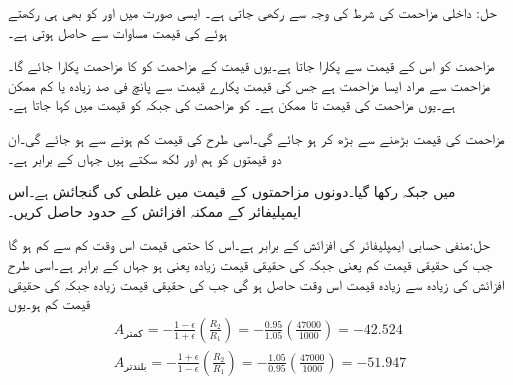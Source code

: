 حل:
داخلی مزاحمت  کی شرط کی وجہ سے  رکھی جاتی ہے۔ ایسی صورت میں  اور  کو بھی  ہی رکھتے ہوئے  کی قیمت مساوات   سے حاصل ہوتی ہے۔  

مزاحمت کو اس کے قیمت سے پکارا جاتا ہے۔یوں  قیمت کے مزاحمت کو  کا مزاحمت پکارا جائے گا۔ مزاحمت سے مراد ایسا مزاحمت ہے جس کی قیمت پکارے قیمت سے  پانچ فی صد زیادہ یا کم ممکن ہے۔یوں 
 مزاحمت کی قیمت  تا  ممکن ہے۔ کو مزاحمت کی  جبکہ   کو قیمت میں  کہا جاتا ہے۔

مزاحمت  کی قیمت  بڑھنے سے  بڑھ کر  ہو جائے گی۔اسی طرح  کی قیمت  کم ہونے سے   ہو جائے گی۔ان دو قیمتوں کو ہم  اور  لکھ سکتے ہیں جہاں  کے برابر ہے۔

 میں  جبکہ  رکھا گیا۔دونوں مزاحمتوں کے قیمت میں  غلطی کی گنجائش ہے۔اس ایمپلیفائر کے ممکنہ افزائش کے حدود حاصل کریں۔

حل:منفی حسابی ایمپلیفائر کی افزائش  کے برابر ہے۔اس کا حتمی قیمت اس وقت کم سے کم  ہو گا جب  کی حقیقی قیمت  کم یعنی  جبکہ  کی حقیقی قیمت  زیادہ  یعنی  ہو جہاں  کے برابر ہے۔اسی طرح افزائش کی زیادہ سے زیادہ قیمت اس وقت حاصل ہو گی جب  کی حقیقی قیمت  زیادہ جبکہ  کی حقیقی قیمت  کم ہو۔یوں
\begin{align*}
A_{\text{کمتر}}=-\frac{1-\epsilon}{1+\epsilon} \left(\frac{R_2}{R_1} \right)=-\frac{0.95}{1.05} \left(\frac{47000}{1000}\right)=-42.524\\
A_{\text{بلندتر}}=-\frac{1+\epsilon}{1-\epsilon} \left(\frac{R_2}{R_1} \right)=-\frac{1.05}{0.95} \left(\frac{47000}{1000}\right)=-51.947
\end{align*}

